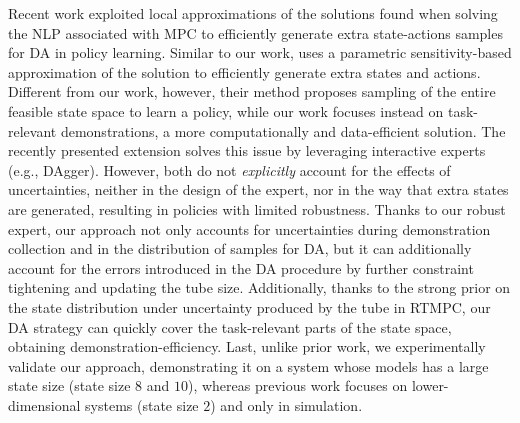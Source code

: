 Recent work \cite{krishnamoorthy2022sensitivity, krishnamoorthy2023improved} exploited local approximations of the solutions found when solving the \ac{NLP} associated with \ac{MPC} to efficiently generate extra state-actions samples for \ac{DA} in policy learning. Similar to our work, \cite{krishnamoorthy2022sensitivity} uses a parametric sensitivity-based approximation of the solution to efficiently generate extra states and actions. Different from our work, however, their method 
proposes sampling of the entire feasible state space to learn a policy, while our work focuses instead on task-relevant demonstrations, a more computationally and data-efficient solution. The recently presented extension \cite{krishnamoorthy2023improved} solves this issue by leveraging interactive experts (e.g., DAgger). However, both \cite{krishnamoorthy2022sensitivity, krishnamoorthy2023improved} do not \textit{explicitly} account for the effects of uncertainties, neither in the design of the expert, nor in the way that extra states are generated, resulting in policies with limited robustness. Thanks to our robust expert, our approach not only accounts for uncertainties during demonstration collection and in the distribution of samples for \ac{DA}, but it can additionally account for the errors introduced in the \ac{DA} procedure by further constraint tightening and updating the tube size. Additionally, thanks to the strong prior on the state distribution under uncertainty produced by the tube in \ac{RTMPC}, our \ac{DA} strategy can quickly cover the task-relevant parts of the state space, obtaining demonstration-efficiency.
Last, unlike prior work, we experimentally validate our approach, demonstrating it on a system whose models has a large state size (state size $8$ and $10$), whereas previous work focuses on lower-dimensional systems (state size $2$) and only in simulation. 